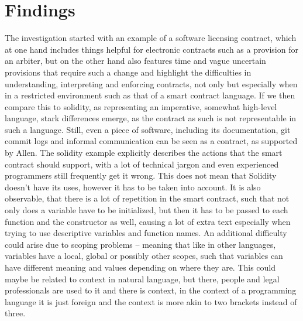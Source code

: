 \documentclass[conference]{IEEEtran}
\begin{document}
\section{Findings}
The investigation started with an example of a software licensing contract, which at one hand includes things helpful for electronic contracts such as a provision for an arbiter, but on the other hand also features time and vague uncertain provisions that require such a change and highlight the difficulties in understanding, interpreting and enforcing contracts, not only but especially when in a restricted environment such as that of a smart contract language.
If we then compare this to solidity, as representing an imperative, somewhat high-level language, stark differences emerge, as the contract as such is not representable in such a language. Still, even a piece of software, including its documentation, git commit logs and informal communication %
can be seen as a contract, as supported %
by Allen. \cite{allenWrappedStackedSmart2018} The solidity example explicitly describes the actions that the smart contract should support, with a lot of technical jargon and even experienced programmers still frequently get it wrong. \cite{atzeiSurveyAttacksEthereum2017} This does not mean that Solidity doesn’t have its uses, however it has to be taken into account. It is also observable, that there is a lot of repetition in the smart contract, such that not only does a variable have to be initialized, but then it has to be passed to each function and the constructor as well, causing a lot of extra text especially when trying to use descriptive variables and function names. An additional difficulty could arise due to scoping problems – meaning that like in other languages, variables have a local, global or possibly other scopes, such that variables can have different meaning and values depending on where they are. This could maybe be related to context in natural language, but there, people and legal professionals are used to it and there is context, in the context of %
a programming language it is just foreign and the context is more akin to two brackets instead of three.
\end{document}

